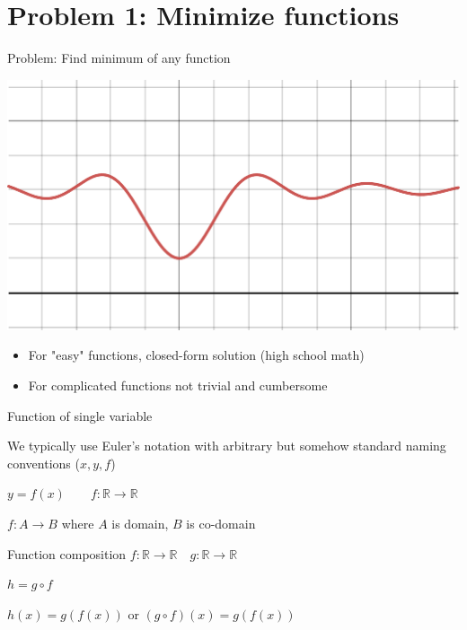 \documentclass[12pt,aspectratio=169,handout]{beamer}
\begin{document}
\section{Problem 1: Minimize functions}




\begin{frame}{Problem: Find minimum of any function}
	
	\includegraphics[width=0.7\linewidth]{img/desmos-graph1.pdf}
	
	\begin{itemize}
		\item For "easy" functions, closed-form solution (high school math)
		\item For complicated functions not trivial and cumbersome
	\end{itemize}
	
	
	
\end{frame}







\begin{frame}{Function of single variable}
	
	We typically use Euler's notation with arbitrary but somehow standard naming conventions ($x, y, f$)
	
	$y = f (x) \qquad f: \mathbb{R} \to \mathbb{R}$
	
	$f : A \to B$ where $A$ is domain, $B$ is co-domain
	
	\bigskip
	
	\begin{block}{Function composition}
		$f: \mathbb{R} \to \mathbb{R} \quad g: \mathbb{R} \to \mathbb{R}$
		
		$h = g \circ f$
		
		$h(x) = g(f(x))$ or $(g \circ f)(x)= g(f(x))$
	\end{block}
	
\end{frame}
\end{document}
